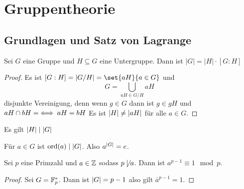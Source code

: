\chapter{Gruppentheorie}
\section{Grundlagen und Satz von Lagrange}
\begin{Satz}[Gruppenordnung]
    Sei \(G\) eine Gruppe und \(H\subseteq G\) eine Untergruppe. Dann ist \(|G|=|H|\cdot [G:H]\)
\end{Satz}
\begin{proof}
    Es ist \([G:H]=\abs{G/H}=\set{aH}{a\in G}\) und \[G=\bigcup_{aH\in G/H}aH\] disjunkte Vereinigung, denn wenn \(g\in G\) dann ist \(g\in gH\) und \(aH\cap bH=\empty \iff aH=bH\) Es ist \(\lvert H\rvert\not=\lvert aH\rvert\) für alle \(a\in G\).
\end{proof}
\begin{Kor}\label{Kor:Lagrange}
    Es gilt \(\lvert H\rvert\mid\lvert G\rvert\)
\end{Kor}
\begin{Kor}\label{Kor:Lagrange2}
Für \(a\in G\) ist \(\operatorname{ord}(a)\mid \lvert G\rvert\). Also \(a^{\lvert G\rvert}=e\).
\end{Kor}
\begin{Kor}\label{Kleiner Satz von Fermat}
    Sei \(p\) eine Primzahl und \(a\in\mathbb{Z}\) sodass \(p\not\mid a\). Dann ist \(a^{p-1}\equiv 1\mod p\).
\end{Kor}
\begin{proof}
    Sei \(G=\mathbb{F}_p^*\). Dann ist \(\lvert G\rvert=p-1\) also gilt \(\bar a^{p-1}=1\).
\end{proof}

